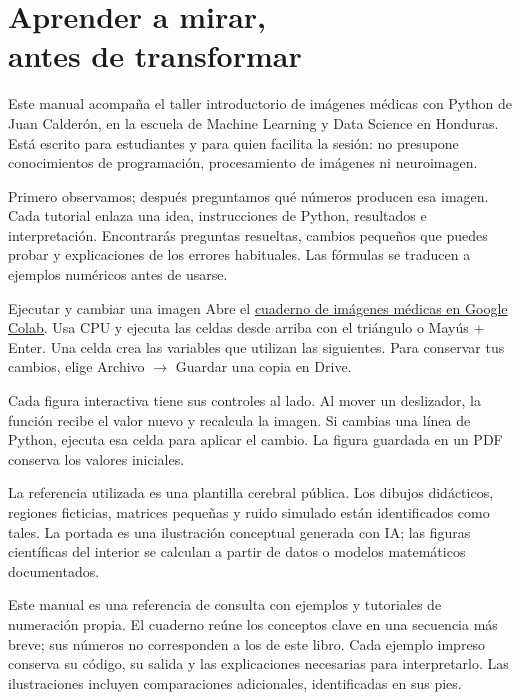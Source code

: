 



\LibroCover

\frontmatter

\chapter*{Aprender a mirar,\\antes de transformar}

Este manual acompaña el taller introductorio de imágenes médicas con Python de Juan Calderón, en la escuela de Machine Learning y Data Science en Honduras. Está escrito para estudiantes y para quien facilita la sesión: no presupone conocimientos de programación, procesamiento de imágenes ni neuroimagen.


Primero observamos; después preguntamos qué números producen esa imagen. Cada tutorial enlaza una idea, instrucciones de Python, resultados e interpretación. Encontrarás preguntas resueltas, cambios pequeños que puedes probar y explicaciones de los errores habituales. Las fórmulas se traducen a ejemplos numéricos antes de usarse.


\begin{Idea}{Ejecutar y cambiar una imagen}
Abre el \href{https://colab.research.google.com/github/FisikMedik/taller-imagenes-medicas-python/blob/main/Taller_imagenes_medicas.ipynb}{cuaderno de imágenes médicas en Google Colab}. Usa CPU y ejecuta las celdas desde arriba con el triángulo o Mayús + Enter. Una celda crea las variables que utilizan las siguientes. Para conservar tus cambios, elige Archivo $\rightarrow$ Guardar una copia en Drive.

Cada figura interactiva tiene sus controles al lado. Al mover un deslizador, la función recibe el valor nuevo y recalcula la imagen. Si cambias una línea de Python, ejecuta esa celda para aplicar el cambio. La figura guardada en un PDF conserva los valores iniciales.
\end{Idea}

La referencia utilizada es una plantilla cerebral pública. Los dibujos didácticos, regiones ficticias, matrices pequeñas y ruido simulado están identificados como tales. La portada es una ilustración conceptual generada con IA; las figuras científicas del interior se calculan a partir de datos o modelos matemáticos documentados.


Este manual es una referencia de consulta con ejemplos y tutoriales de numeración propia. El cuaderno reúne los conceptos clave en una secuencia más breve; sus números no corresponden a los de este libro. Cada ejemplo impreso conserva su código, su salida y las explicaciones necesarias para interpretarlo. Las ilustraciones incluyen comparaciones adicionales, identificadas en sus pies.


